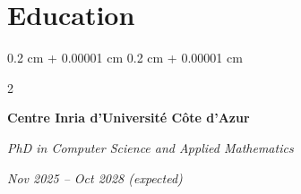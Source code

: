 \documentclass[10pt, letterpaper]{article}
\newenvironment{highlightsforbulletentries}{
    \begin{itemize}[
        topsep=0.10 cm,
        parsep=0.10 cm,
        partopsep=0pt,
        itemsep=0pt,
        leftmargin=10pt
    ]
}{
    \end{itemize}
} %
\newenvironment{onecolentry}{
    \begin{adjustwidth}{
        0.2 cm + 0.00001 cm
    }{
        0.2 cm + 0.00001 cm
    }
}{
    \end{adjustwidth}
} %
\newenvironment{twocolentry}[2][]{
    \onecolentry
    \def\secondColumn{#2}
    \setcolumnwidth{\fill, 6.5 cm}
    \begin{paracol}{2}
}{
    \switchcolumn \raggedleft \secondColumn
    \end{paracol}
    \endonecolentry
} %
\let\hrefWithoutArrow\href
\renewcommand{\href}[2]{\hrefWithoutArrow{#1}{\ifthenelse{\equal{#2}{}}{ }{#2 }\raisebox{.15ex}{\footnotesize \faExternalLink*}}}
\begin{document}



    









    \section{Education}



        
        \begin{twocolentry}{

        \textit{Nov 2025 – Oct 2028 (expected)}}
        
            \textbf{Centre Inria d'Université Côte d'Azur}

            \textit{PhD in Computer Science and Applied Mathematics}
        \end{twocolentry}
\end{document}
